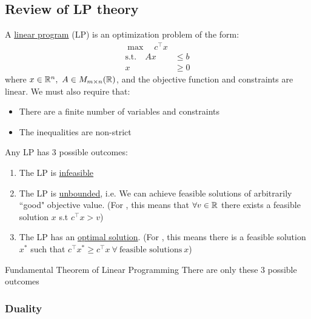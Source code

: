 \subsection{Review of LP theory}
A \underline{linear program} (LP) is an optimization problem of the form:
\begin{equation}\label{eq:intro-review-lp}
\begin{aligned}
    \max \quad c^\intercal x & \\
    \text{s.t.} \quad Ax &\leq b \\
    x &\geq 0
\end{aligned}
\end{equation}
where $x \in \mathbb{R}^n, \ A \in M_{m \times n}(\mathbb{R}) $, and the objective function and constraints are linear. We must also require that:
\begin{itemize}
    \item There are a finite number of variables and constraints
    \item The inequalities are non-strict
\end{itemize}

Any LP has 3 possible outcomes:
\begin{enumerate}
    \item The LP is \underline{infeasible}
    \item The LP is \underline{unbounded}, i.e. We can achieve feasible solutions of arbitrarily ``good" objective value. (For , this means that $\forall v \in \mathbb{R}$ there exists a feasible solution $x$ s.t $c^\intercal x > v$)
    \item The LP has an \underline{optimal solution}. (For , this means there is a feasible solution $x^*$ such that $c^\intercal x^* \geq c^\intercal x \ \forall \ \text{feasible solutions} \ x$)
\end{enumerate}

\begin{theorem}{Fundamental Theorem of Linear Programming}{}
    There are only these $3$ possible outcomes
\end{theorem}

\subsubsection{Duality}
